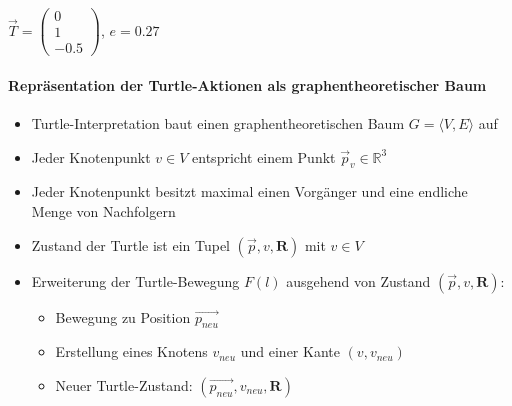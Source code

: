\begin{center}
\begin{minipage}[c]{0.4\textwidth}
		$\overrightarrow{T} =\begin{pmatrix}
		0 \\ 1 \\ -0.5
		\end{pmatrix}$, $e = 0.27$
	\end{minipage}
\end{center}





\newpage
{}

\paragraph{Repräsentation der Turtle-Aktionen als graphentheoretischer Baum\\}

\begin{itemize}
	\item Turtle-Interpretation baut einen graphentheoretischen Baum $G=\langle V,E\rangle$ auf\\
	
	\item Jeder Knotenpunkt $v\in V$ entspricht einem Punkt $\overrightarrow{p}_v \in \mathbb{R}^3$\\
	
	\item Jeder Knotenpunkt besitzt maximal einen Vorgänger und eine endliche Menge von Nachfolgern \\
		
	\item Zustand der Turtle ist ein Tupel $(\overrightarrow{p}, v, \boldsymbol{R})$ mit $v\in V$ \\
	
\end{itemize}




\newpage
\begin{itemize}
	\item Erweiterung der Turtle-Bewegung \boldmath$F(l)$ ausgehend von Zustand $(\overrightarrow{p}, v, \boldsymbol{R})$:
	\begin{itemize}
		\item Bewegung zu Position $\overrightarrow{p_{neu}}$\\
		
		\item Erstellung eines Knotens $v_{neu}$ und einer Kante $(v, v_{neu})$\\
		
		\item Neuer Turtle-Zustand: $(\overrightarrow{p_{neu}}, v_{neu}, \boldsymbol{R})$\\
	\end{itemize}
\end{itemize}



